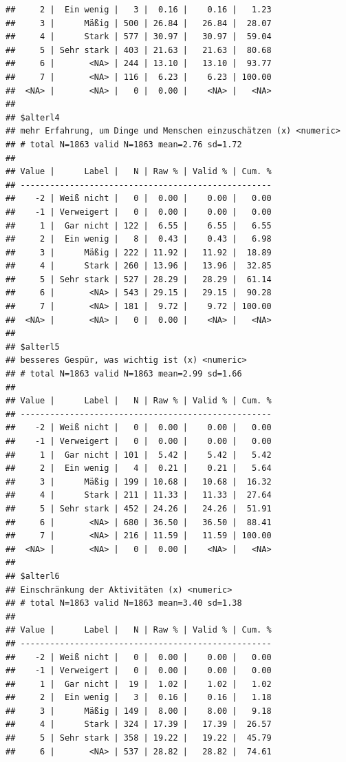 \documentclass[
  doc]{apa6}
\begin{document}
\begin{verbatim}
##     2 |  Ein wenig |   3 |  0.16 |    0.16 |   1.23
##     3 |      Mäßig | 500 | 26.84 |   26.84 |  28.07
##     4 |      Stark | 577 | 30.97 |   30.97 |  59.04
##     5 | Sehr stark | 403 | 21.63 |   21.63 |  80.68
##     6 |       <NA> | 244 | 13.10 |   13.10 |  93.77
##     7 |       <NA> | 116 |  6.23 |    6.23 | 100.00
##  <NA> |       <NA> |   0 |  0.00 |    <NA> |   <NA>
## 
## $alterl4
## mehr Erfahrung, um Dinge und Menschen einzuschätzen (x) <numeric> 
## # total N=1863 valid N=1863 mean=2.76 sd=1.72
## 
## Value |      Label |   N | Raw % | Valid % | Cum. %
## ---------------------------------------------------
##    -2 | Weiß nicht |   0 |  0.00 |    0.00 |   0.00
##    -1 | Verweigert |   0 |  0.00 |    0.00 |   0.00
##     1 |  Gar nicht | 122 |  6.55 |    6.55 |   6.55
##     2 |  Ein wenig |   8 |  0.43 |    0.43 |   6.98
##     3 |      Mäßig | 222 | 11.92 |   11.92 |  18.89
##     4 |      Stark | 260 | 13.96 |   13.96 |  32.85
##     5 | Sehr stark | 527 | 28.29 |   28.29 |  61.14
##     6 |       <NA> | 543 | 29.15 |   29.15 |  90.28
##     7 |       <NA> | 181 |  9.72 |    9.72 | 100.00
##  <NA> |       <NA> |   0 |  0.00 |    <NA> |   <NA>
## 
## $alterl5
## besseres Gespür, was wichtig ist (x) <numeric> 
## # total N=1863 valid N=1863 mean=2.99 sd=1.66
## 
## Value |      Label |   N | Raw % | Valid % | Cum. %
## ---------------------------------------------------
##    -2 | Weiß nicht |   0 |  0.00 |    0.00 |   0.00
##    -1 | Verweigert |   0 |  0.00 |    0.00 |   0.00
##     1 |  Gar nicht | 101 |  5.42 |    5.42 |   5.42
##     2 |  Ein wenig |   4 |  0.21 |    0.21 |   5.64
##     3 |      Mäßig | 199 | 10.68 |   10.68 |  16.32
##     4 |      Stark | 211 | 11.33 |   11.33 |  27.64
##     5 | Sehr stark | 452 | 24.26 |   24.26 |  51.91
##     6 |       <NA> | 680 | 36.50 |   36.50 |  88.41
##     7 |       <NA> | 216 | 11.59 |   11.59 | 100.00
##  <NA> |       <NA> |   0 |  0.00 |    <NA> |   <NA>
## 
## $alterl6
## Einschränkung der Aktivitäten (x) <numeric> 
## # total N=1863 valid N=1863 mean=3.40 sd=1.38
## 
## Value |      Label |   N | Raw % | Valid % | Cum. %
## ---------------------------------------------------
##    -2 | Weiß nicht |   0 |  0.00 |    0.00 |   0.00
##    -1 | Verweigert |   0 |  0.00 |    0.00 |   0.00
##     1 |  Gar nicht |  19 |  1.02 |    1.02 |   1.02
##     2 |  Ein wenig |   3 |  0.16 |    0.16 |   1.18
##     3 |      Mäßig | 149 |  8.00 |    8.00 |   9.18
##     4 |      Stark | 324 | 17.39 |   17.39 |  26.57
##     5 | Sehr stark | 358 | 19.22 |   19.22 |  45.79
##     6 |       <NA> | 537 | 28.82 |   28.82 |  74.61

\end{verbatim}
\end{document}
